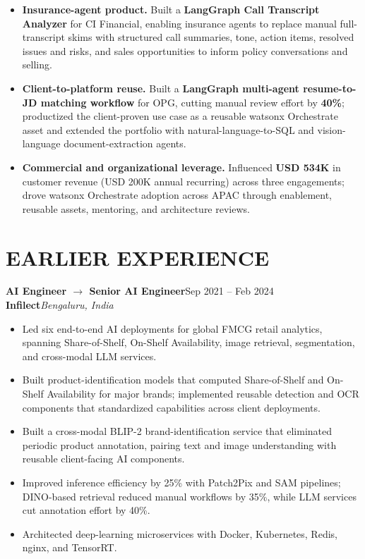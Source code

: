 \documentclass[letterpaper,10pt]{article}
\newcommand{\role}[4]{%
  \textbf{#1}\hfill{\color{muted}\small #2}\\[1pt]
  {\color{accent}\bfseries #3}\hfill{\color{muted}\small\itshape #4}\vspace{3pt}
}
\newcommand{\focus}[1]{\textbf{\color{accent}#1}}
\begin{document}
\begin{itemize}[itemsep=7pt]
        consistency by 22\% across evaluation benchmarks.
  \item \focus{Insurance-agent product.} Built a \textbf{LangGraph Call Transcript Analyzer} for CI Financial, enabling
        insurance agents to replace manual full-transcript skims with structured call summaries, tone, action
        items, resolved issues and risks, and sales opportunities to inform policy conversations and selling.
  \item \focus{Client-to-platform reuse.} Built a \textbf{LangGraph multi-agent resume-to-JD matching workflow} for OPG, cutting manual review
        effort by \textbf{40\%}; productized the client-proven use case as a reusable watsonx Orchestrate asset
        and extended the portfolio with natural-language-to-SQL and vision-language document-extraction agents.
  \item \focus{Commercial and organizational leverage.} Influenced \textbf{USD 534K} in customer revenue
        (USD 200K annual recurring) across three engagements; drove watsonx Orchestrate adoption across APAC
        through enablement, reusable assets, mentoring, and architecture reviews.
\end{itemize}

\newpage
\section*{EARLIER EXPERIENCE}
\role{AI Engineer $\rightarrow$ Senior AI Engineer}{Sep 2021 -- Feb 2024}{Infilect}{Bengaluru, India}
\begin{itemize}[itemsep=3pt]
  \item Led six end-to-end AI deployments for global FMCG retail analytics, spanning Share-of-Shelf,
        On-Shelf Availability, image retrieval, segmentation, and cross-modal LLM services.
  \item Built product-identification models that computed Share-of-Shelf and On-Shelf Availability for major
        brands; implemented reusable detection and OCR components that standardized capabilities across client deployments.
  \item Built a cross-modal BLIP-2 brand-identification service that eliminated periodic product annotation,
        pairing text and image understanding with reusable client-facing AI components.
  \item Improved inference efficiency by 25\% with Patch2Pix and SAM pipelines; DINO-based retrieval reduced
        manual workflows by 35\%, while LLM services cut annotation effort by 40\%.
  \item Architected deep-learning microservices with Docker, Kubernetes, Redis, nginx, and TensorRT.
\end{itemize}
\end{document}
